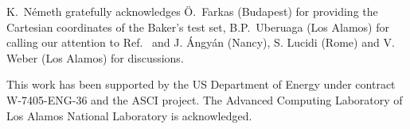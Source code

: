 \documentclass[prl,twocolumn,showpacs,twocolumngrid,superbib]{revtex4}
\newcommand{\commentoutB}[1]{}
\begin{document}
\begin{acknowledgments}
K.~N{\'e}meth gratefully acknowledges {\"{O}}.~Farkas (Budapest) for providing the 
Cartesian coordinates of the Baker's test set,  B.P.~Uberuaga (Los Alamos) for 
calling our attention to Ref.~\cite{force-matching} and  J. {\'A}ngy{\'a}n
(Nancy), S. Lucidi (Rome) and V. Weber (Los Alamos) for discussions.

This work has been supported by the US Department of Energy 
under contract W-7405-ENG-36 and the ASCI project.  
The Advanced Computing Laboratory of Los 
Alamos National Laboratory is acknowledged.
\end{acknowledgments}



\commentoutB{

\clearpage


}
\end{document}
